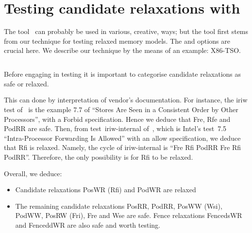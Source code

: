 \section{Testing\label{diy:intro} candidate relaxations with \diy}

The tool~\diy{} can probably be used in various, creative, ways;
but the tool first stems from our technique for testing relaxed memory
models.
The  and  options are crucial here.
We describe our technique by the means of an example: X86-TSO.

\subsection{}

Before engaging in testing it is important to categorise
candidate relaxations as safe or relaxed.

This can done by interpretation of vendor's documentation.
For instance, the iriw test of~\mysec{\ref{iriw}} is the example 7.7 of
\cite{intel:white}
``Stores Are Seen in a Consistent Order by Other Processors'',
with a Forbid specification.
Hence we deduce that Fre, Rfe and PodRR are safe.
Then, from test~iriw-internal of~\mysec{\ref{iriw}},
which is Intel's test~7.5 ``Intra-Processor Forwarding Is Allowed''
with an allow specification,
we deduce that Rfi is relaxed.
Namely, the cycle of iriw-internal is
``Fre Rfi PodRR Fre Rfi PodRR''. Therefore, the only possibility is for
Rfi to be relaxed.

Overall, we deduce:
\begin{itemize}
\item Candidate relaxations PosWR (Rfi) and PodWR are relaxed
\item The remaining candidate relaxations PosRR, PodRR, PosWW (Wsi),  PodWW,
PosRW (Fri), Fre and Wse are safe.
Fence relaxations FencedsWR and FenceddWR are also safe
and worth testing.
\end{itemize}

